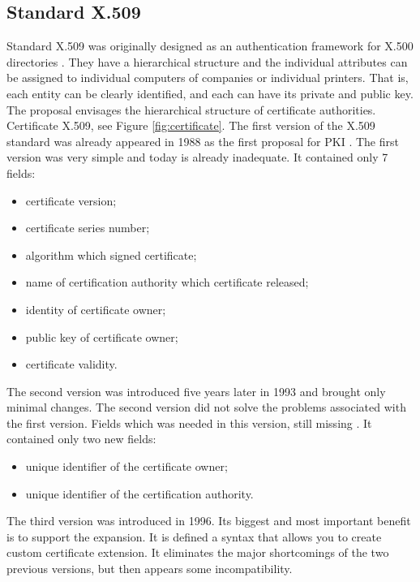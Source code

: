 \documentclass[
  digital, %
  notable,   %
  lof,     %
  lot,     %
]{fithesis3}
\begin{document}
\subsection{Standard X.509}
Standard X.509 was originally designed as an authentication framework for X.500 
directories \cite{schmeh2006cryptography}. They have a hierarchical structure and the 
individual attributes can be assigned to individual computers of companies or individual 
printers. That is, each entity can be clearly identified, and each can have its private and 
public key. The proposal envisages the hierarchical structure of certificate authorities. 
Certificate X.509, see Figure \ref{fig:certificate}.
\vskip 0.1in
The first version of the X.509 standard was already appeared in 1988 as the first proposal for 
PKI \cite{schmeh2006cryptography}. The first version was very simple and today is already 
inadequate. It contained only 7 fields:
\vskip 0.1in
\begin{itemize}[leftmargin=2em,rightmargin=1em,itemsep=0.75\parskip,parsep=0em,topsep=0em,partopsep=0em]
\item certificate version;
\item certificate series number;
\item algorithm which signed certificate;
\item name of certification authority which certificate released;
\item identity of certificate owner;
\item public key of certificate owner;
\item certificate validity.
\end{itemize}
\vskip 0.1in
The second version was introduced five years later in 1993 and brought only minimal changes. 
The second version did not solve the problems associated with the first version. Fields which 
was needed in this version, still missing \cite{schmeh2006cryptography}. It contained only two 
new fields:
\vskip 0.1in
\begin{itemize}[leftmargin=2em,rightmargin=1em,itemsep=0.75\parskip,parsep=0em,topsep=0em,partopsep=0em]
\item unique identifier of the certificate owner;
\item unique identifier of the certification authority.
\end{itemize}
\vskip 0.1in
The third version was introduced in 1996. Its biggest and most important benefit is to support 
the expansion. It is defined a syntax that allows you to create custom certificate extension. 
It eliminates the major shortcomings of the two previous versions, but then appears some 
incompatibility. 
\end{document}
